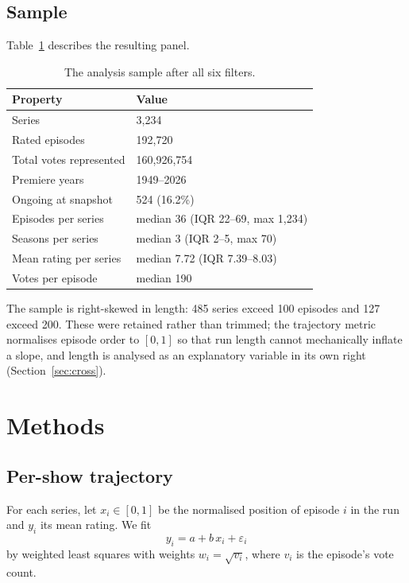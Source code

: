 \documentclass[11pt,a4paper]{article}
\begin{document}
\subsection{Sample}

Table~\ref{tab:sample} describes the resulting panel.

\begin{table}[htbp]
\centering
\small
\caption{The analysis sample after all six filters.}
\label{tab:sample}
\begin{tabular}{lp{9.0cm}}
\toprule
\textbf{Property} & \textbf{Value} \\
\midrule
Series & 3,234 \\
Rated episodes & 192,720 \\
Total votes represented & 160,926,754 \\
Premiere years & 1949--2026 \\
Ongoing at snapshot & 524 (16.2\%) \\
Episodes per series & median 36 (IQR 22--69, max 1,234) \\
Seasons per series & median 3 (IQR 2--5, max 70) \\
Mean rating per series & median 7.72 (IQR 7.39--8.03) \\
Votes per episode & median 190 \\
\bottomrule
\end{tabular}
\end{table}

The sample is right-skewed in length: 485 series exceed 100 episodes and 127
exceed 200. These were retained rather than trimmed; the trajectory metric
normalises episode order to $[0,1]$ so that run length cannot mechanically
inflate a slope, and length is analysed as an explanatory variable in its own
right (Section~\ref{sec:cross}).

\FloatBarrier
\section{Methods}

\FloatBarrier
\subsection{Per-show trajectory}
\label{sec:traj}

For each series, let $x_i \in [0,1]$ be the normalised position of episode $i$
in the run and $y_i$ its mean rating. We fit
\[
  y_i = a + b\,x_i + \varepsilon_i
\]
by weighted least squares with weights $w_i = \sqrt{v_i}$, where $v_i$ is the
episode's vote count.
\end{document}
